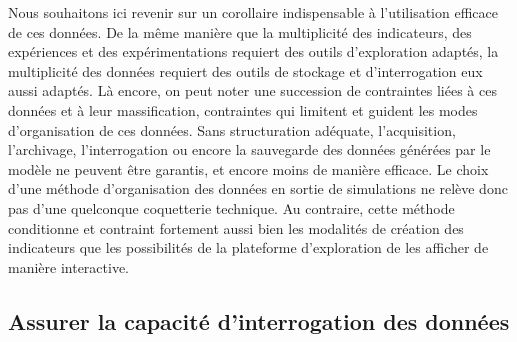 Nous souhaitons ici revenir sur un corollaire indispensable à l'utilisation efficace de ces données.
De la même manière que la multiplicité des indicateurs, des expériences et des expérimentations requiert des outils d'exploration adaptés, la multiplicité des données requiert des outils de stockage et d'interrogation eux aussi adaptés.
Là encore, on peut noter une succession de contraintes liées à ces données et à leur massification, contraintes qui limitent et guident les modes d'organisation de ces données.
Sans structuration adéquate, l'acquisition, l'archivage, l'interrogation ou encore la sauvegarde des données générées par le modèle ne peuvent être garantis, et encore moins de manière efficace.
Le choix d'une méthode d'organisation des données en sortie de simulations ne relève donc pas d'une quelconque coquetterie technique.
Au contraire, cette méthode conditionne et contraint fortement aussi bien les modalités de création des indicateurs que les possibilités de la plateforme d'exploration de les afficher de manière interactive.

%
%




\subsection{Assurer la capacité d'interrogation des données\label{subsec:capacite-interrogation}}

